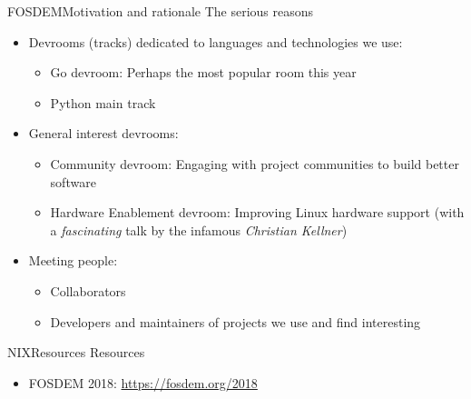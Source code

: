 \documentclass[10pt]{beamer}
\begin{document}
\begin{frame}{FOSDEM}{Motivation and rationale}
    The serious reasons
    \begin{itemize}
        \item Devrooms (tracks) dedicated to languages and technologies we use:
            \begin{itemize}
                \item Go devroom: Perhaps the most popular room this year
                \item Python main track
            \end{itemize}
        \item General interest devrooms:
            \begin{itemize}
                \item Community devroom: Engaging with project communities to build better software
                \item Hardware Enablement devroom: Improving Linux hardware support (with a \emph{fascinating} talk by the infamous \emph{Christian Kellner})
            \end{itemize}
        \item Meeting people:
            \begin{itemize}
                \item Collaborators
                \item Developers and maintainers of projects we use and find interesting
            \end{itemize}
    \end{itemize}
\end{frame}

\begin{frame}{NIX}{Resources}
    Resources

    \begin{itemize}
        \item FOSDEM 2018: \url{https://fosdem.org/2018}
    \end{itemize}
\end{frame}
\end{document}
